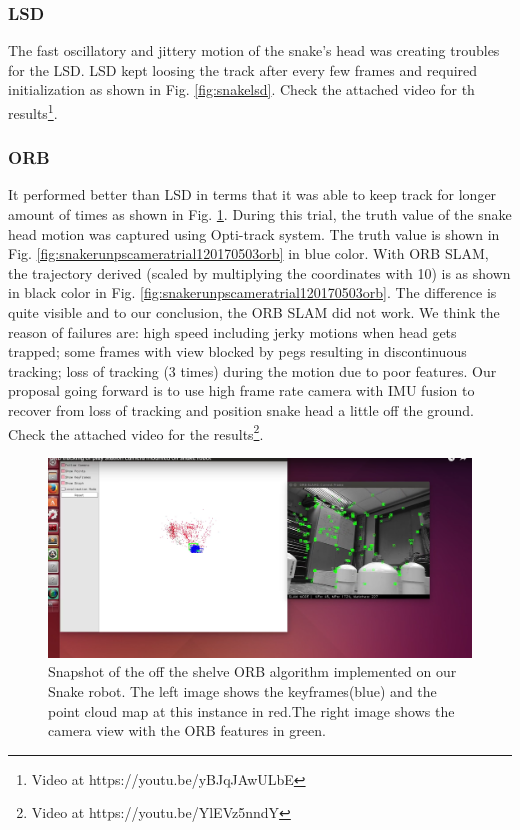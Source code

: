 \subsubsection{LSD}
The fast oscillatory and jittery motion of the snake’s head was creating troubles for the LSD. LSD kept loosing the track after every few frames and required initialization as shown in Fig. \ref{fig:snakelsd}. Check the attached video for th results\footnote{Video at https://youtu.be/yBJqJAwULbE}.



\subsubsection{ORB}
It performed better than LSD in terms that it was able to keep track for longer amount of times as shown in Fig. \ref{fig:snakeorb}. During this trial, the truth value of the snake head motion was captured using Opti-track system. The truth value is shown in Fig. \ref{fig:snakerunpscameratrial120170503orb} in blue color. With ORB SLAM, the trajectory derived (scaled by multiplying the coordinates with 10) is as shown in black color in Fig. \ref{fig:snakerunpscameratrial120170503orb}. The difference is quite visible and to our conclusion, the ORB SLAM did not work. We think the reason of failures are: high speed including jerky motions when head gets trapped; some frames with view blocked by pegs resulting in discontinuous tracking; loss of tracking (3 times) during the motion due to poor features. Our proposal going forward is to use high frame rate camera with IMU fusion to recover from loss of tracking and position snake head a little off the ground. Check the attached video for the results\footnote{Video at https://youtu.be/\textunderscore YlEVz5nndY}.

\begin{figure}[H]
	\centering
	\includegraphics[width=1.0\linewidth]{figures/Snake_ORB}
	\caption{Snapshot of the off the shelve ORB algorithm implemented on our Snake robot. The left image shows the keyframes(blue) and the point cloud map at this instance in red.The right image shows the camera view with the ORB features in green.}
	\label{fig:snakeorb}
\end{figure}

